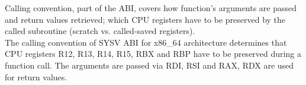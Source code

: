 Calling convention, part of the ABI, covers how function's arguments are passed
and return values retrieved; which CPU registers have to be preserved by the
called subroutine (scratch vs. called-saved registers).\\

The calling convention of SYSV ABI for x86\_64 architecture determines that CPU
registers R12, R13, R14, R15, RBX and RBP have to be preserved during a function
call. The arguments are passed via RDI, RSI and RAX, RDX are used for return
values.
